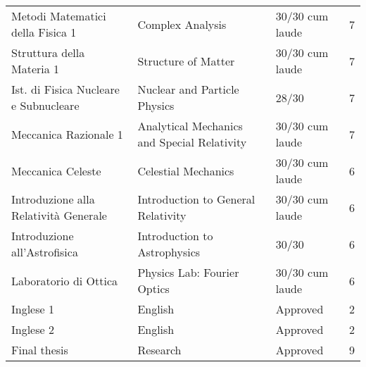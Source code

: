 \documentclass[11pt,letterpaper,sans]{moderncv}   %
\begin{document}
{\begin{tabular*}{\linewidth}{l	@{\hspace{1.2cm}}l@{\hspace{1.2cm}}l@{\hspace{1.2cm}}l}
Metodi Matematici della Fisica 1			&  Complex Analysis &   30/30 cum laude &7\\
Struttura della Materia 1					&  Structure of Matter&  30/30 cum laude  &7\\
Ist. di Fisica Nucleare e Subnucleare			&  Nuclear and Particle Physics& 28/30 &7\\	
Meccanica Razionale 1					&  Analytical Mechanics and Special Relativity& 30/30  cum laude &7\\	
Meccanica Celeste						&  Celestial Mechanics&  30/30  cum laude&6\\	
Introduzione alla Relatività Generale			&  Introduction to General Relativity& 30/30 cum laude &6\\	
Introduzione all'Astrofisica					&  Introduction to Astrophysics&  30/30 &6\\	
Laboratorio di Ottica						&  Physics Lab: Fourier Optics&  30/30  cum laude&6\\	
Inglese 1								&  English & Approved  &2\\	
Inglese 2								&  English & Approved &2\\	
Final thesis						& Research  & Approved &  9\\
\end{tabular*}}\vspace{-1cm}
\end{document}
